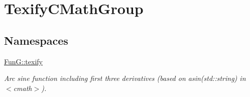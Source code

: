 \hypertarget{group__TexifyCMathGroup}{\section{Texify\-C\-Math\-Group}
\label{group__TexifyCMathGroup}
}
\subsection*{Namespaces}
\begin{DoxyCompactItemize}
\item 
\hyperlink{namespaceFunG_1_1texify}{Fun\-G\-::texify}
\begin{DoxyCompactList}\small\item\em Arc sine function including first three derivatives (based on asin(std\-::string) in $<$cmath$>$). \end{DoxyCompactList}\end{DoxyCompactItemize}
